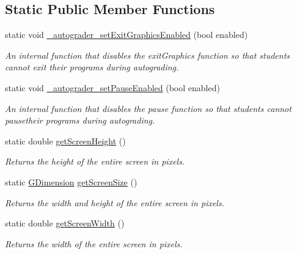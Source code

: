 \subsection*{Static Public Member Functions}
\begin{DoxyCompactItemize}
\item 
static void \mbox{\hyperlink{classGWindow_a2e528e6ab0611fb2bd33810b4a610403}{\+\_\+autograder\+\_\+set\+Exit\+Graphics\+Enabled}} (bool enabled)
\begin{DoxyCompactList}\small\item\em An internal function that disables the exit\+Graphics function so that students cannot exit their programs during autograding. \end{DoxyCompactList}\item 
static void \mbox{\hyperlink{classGWindow_ae51372f06b62dd7ffef8678b147cc70a}{\+\_\+autograder\+\_\+set\+Pause\+Enabled}} (bool enabled)
\begin{DoxyCompactList}\small\item\em An internal function that disables the pause function so that students cannot pausetheir programs during autograding. \end{DoxyCompactList}\item 
static double \mbox{\hyperlink{classGWindow_a9942379fdf4fb4445c35eaf3390b7ccb}{get\+Screen\+Height}} ()
\begin{DoxyCompactList}\small\item\em Returns the height of the entire screen in pixels. \end{DoxyCompactList}\item 
static \mbox{\hyperlink{classGDimension}{G\+Dimension}} \mbox{\hyperlink{classGWindow_ae3d08d5cde8163274459797770596809}{get\+Screen\+Size}} ()
\begin{DoxyCompactList}\small\item\em Returns the width and height of the entire screen in pixels. \end{DoxyCompactList}\item 
static double \mbox{\hyperlink{classGWindow_adc82933bd579ab83d7cd4e3bc5f79a12}{get\+Screen\+Width}} ()
\begin{DoxyCompactList}\small\item\em Returns the width of the entire screen in pixels. \end{DoxyCompactList}\end{DoxyCompactItemize}
